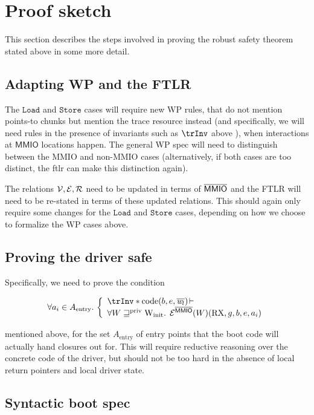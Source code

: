 \documentclass{article}
\newcommand{\X}[1]{\ensuremath{\mathrm{#1}}}
\newcommand{\V}[1]{\ensuremath{\mathit{#1}}}
\newcommand{\I}[1]{\ensuremath{\mathtt{#1}}}
\newcommand{\Sf}[1]{\ensuremath{\mathsf{#1}}}
\newcommand{\MMIO}{\Sf{MMIO}\xspace}
\DeclareMathOperator{\driverC}{code}
\begin{document}
\section{Proof sketch}
This section describes the steps involved in proving the robust safety theorem
stated above in some more detail.

\subsection{Adapting WP and the FTLR}
The $\I{Load}$ and $\I{Store}$ cases will require new WP rules, that do not mention
points-to chunks but mention the trace resource instead (and specifically, we
will need rules in the presence of invariants such as $\trInv$ above ), when interactions at
\MMIO locations happen. The general WP spec will need to distinguish between
the MMIO and non-MMIO cases (alternatively, if both cases are too distinct, the
ftlr can make this distinction again).

The relations $\mathcal{V},\mathcal{E},\mathcal{R}$ need to be updated in terms of $\notMMIO$ and the FTLR will need to be re-stated in terms of these updated relations. This should again only
require some changes for the $\I{Load}$ and $\I{Store}$ cases, depending on how
we choose to formalize the WP cases above.

\subsection{Proving the driver safe}
Specifically, we need to prove the condition

\[
\forall a_{i} \in A_{\X{entry}} \ldotp\,\left\{
    {\begin{array}{ll}
    \trInv \ast
    \driverC(b,e,\overline{\V{w}_l})\!
         \vdash \\
         \forall W \Wpriv \Winit \ldotp\;\ER^{\notMMIO} (W) (\X{RX}, g, b, e, a_i)
        \end{array}} \right.
\]

mentioned above, for the set $A_{\X{entry}}$ of entry points that the boot code
will actually hand closures out for. This will require reductive reasoning over the concrete code of
the driver, but should not be too hard in the absence of local return pointers
and local driver state.

\subsection{Syntactic boot spec}
\end{document}
